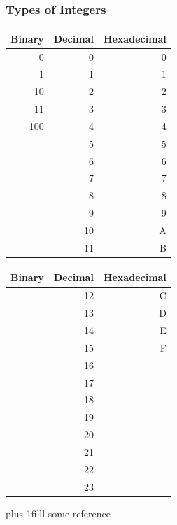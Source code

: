 \documentclass[fleqn]{beamer} %
\newcommand{\sectiontitleII}{Types of Integers}
\newcommand{\btVFill}{\vskip0pt plus 1filll}
\begin{document}
\begin{frame}[label=sectionII] \small
\frametitle{\sectiontitleII}
\bigskip

\begin{multicols}{2}
\begin{tabular}{|r|r|r|} \hline
	Binary 	& Decimal 	& Hexadecimal \\ \hline
	0		& 0			& 0 		\\ \hline	
	1		& 1			& 1 		\\ \hline
	10		& 2			& 2 		\\ \hline
	11		& 3			& 3 		\\ \hline
	100		& 4			& 4 		\\ \hline
			& 5			& 5 		\\ \hline
			& 6			& 6 		\\ \hline
		    & 7			& 7 		\\ \hline
			& 8			& 8 		\\ \hline
			& 9			& 9 		\\ \hline
			& 10		& A 		\\ \hline
			& 11		& B 		\\ \hline
\end{tabular}

\begin{tabular}{|r|r|r|} \hline
	Binary 	& Decimal 	& Hexadecimal \\ \hline
			& 12		& C 		\\ \hline	
			& 13		& D 		\\ \hline
			& 14		& E 		\\ \hline
			& 15		& F 		\\ \hline
			& 16		&  		\\ \hline
			& 17		&  		\\ \hline
			& 18		&  		\\ \hline
			& 19		&  		\\ \hline
			& 20		&  		\\ \hline
			& 21		&  		\\ \hline
			& 22	    &  		\\ \hline
			& 23	    &  		\\ \hline
\end{tabular}
\end{multicols}

\btVFill
\tiny{some reference}		

\end{frame}
\end{document}
